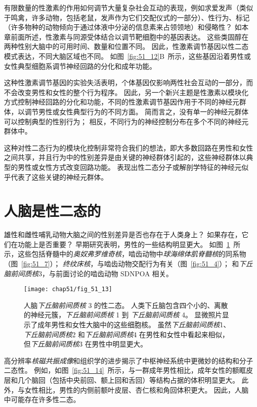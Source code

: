 有限数量的性激素的作用如何调节大量复杂社会互动的表现，例如求爱发声（类似于鸣禽，许多动物，包括老鼠，发声作为它们交配仪式的一部分）、性行为、标记 （许多物种的动物倾向于通过体液中分泌的信息素来占领领地）和侵略性？
如本章前面所述，性激素与同源受体结合以调节靶细胞中的基因表达。
这些类固醇在两种性别大脑中的可用时间、数量和位置不同。
因此，性激素调节基因以性二态模式表达，不同大脑区域也不同。
如图~\ref{fig:51_12}B~所示，这些基因沿着男性或女性典型细胞系调节神经回路的分化和成年功能。


这种性激素调节基因的实验失活表明，个体基因仅影响两性社会互动的一部分，而不会改变男性和女性的整个行为程序。
因此，另一个新兴主题是性激素以模块化方式控制神经回路的分化和功能，不同的性激素调节基因作用于不同的神经元群体，以调节男性或女性典型行为的不同方面。
简而言之，没有单一的神经元群体可以控制典型的性别行为；
相反，不同行为的神经控制分布在多个不同的神经元群体中。


这种对性二态行为的模块化控制非常符合我们的想法，即大多数回路在男性和女性之间共享，并且行为中的性别差异是由关键的神经群体引起的，这些神经群体以典型的男性或女性方式改变回路功能。
表现出性二态分子或解剖学特征的神经元似乎代表了这些关键的神经元群体。



\section{人脑是性二态的}

雄性和雌性哺乳动物大脑之间的性别差异是否也存在于人类身上？
如果存在，它们在功能上是否重要？
早期研究表明，男性的一些结构明显更大。
如图~\ref{fig:51_13}~所示，这些包括脊髓中的\textit{奥奴弗罗维奇核}，啮齿动物中\textit{球海绵体肌脊髓核}的同系物（图~\ref{fig:51_7}）；
\textit{终纹床核}，与啮齿动物交配行为有关（图~\ref{fig:51_4}）；
和\textit{下丘脑前间质核}3，与前面讨论的啮齿动物 SDNPOA 相关。


\begin{figure}[htbp]
	\centering
	\texttt{[image: chap51/fig\_51\_13]}
	\caption{人脑\textit{下丘脑前间质核} 3 的性二态。
		人类下丘脑包含四个小的、离散的神经元簇，\textit{下丘脑前间质核} 1 到 \textit{下丘脑前间质核} 4。
		显微照片显示了成年男性和女性大脑中的这些细胞核。
		虽然\textit{下丘脑前间质核}1、\textit{下丘脑前间质核}2 和\textit{下丘脑前间质核}4 在男性和女性中看起来相似，但\textit{下丘脑前间质核}3 在男性中明显更大\cite{gorski1988hormone}。 }
	\label{fig:51_13}
\end{figure}


高分辨率\textit{核磁共振成像}和组织学的进步揭示了中枢神经系统中更微妙的结构和分子二态性。
例如，如图~\ref{fig:51_14}~所示，与一群成年男性相比，成年女性的额眶皮层和几个脑回（包括中央前回、额上回和舌回）等结构占据的体积明显更大。
此外，与女性相比，男性的内侧前额叶皮层、杏仁核和角回体积更大。
因此，人脑中可能存在许多性二态。


